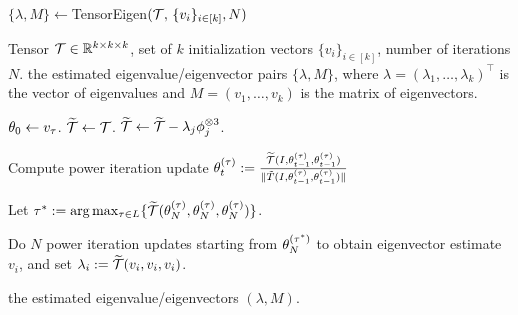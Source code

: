 \begin{algorithm}
\caption{$\{\lambda, M\}\leftarrow $TensorEigen$({\mathcal{T}},\, \{v_i\}_{i\in [k]}, N)$}\label{alg:robustpower}
\begin{algorithmic}
\renewcommand{\algorithmicrequire}{\textbf{Input: }}
\renewcommand{\algorithmicensure}{\textbf{Output: }}
\REQUIRE Tensor ${\mathcal{T}}\in \mathbb{R}^{k \times k \times k}$, set of $k$ initialization vectors $\{v_i\}_{i\in [k]}$, number of
iterations  $N$.
\ENSURE the estimated eigenvalue/eigenvector pairs $\{\lambda, M\}$, where $\lambda=(\lambda_1,\ldots,\lambda_k)^\top$ is the vector of eigenvalues and $M=(v_1,\ldots,v_k)$ is the matrix of eigenvectors.

\STATE $\theta_{0}\leftarrow v_\tau$.
\STATE $\widetilde{{\mathcal{T}}}\leftarrow {\mathcal{T}}$.
\STATE $\widetilde{{\mathcal{T}}}\leftarrow \widetilde{{\mathcal{T}}}- \lambda_j \phi_j^{\otimes 3}$.
\ENDIF
\ENDFOR

\STATE Compute power iteration update
$
\theta_{t}^{(\tau)}  :=
\frac{\widetilde{{\mathcal{T}}}(I, \theta_{t-1}^{(\tau)}, \theta_{t-1}^{(\tau)})}
{\|\tilde{T}(I, \theta_{t-1}^{(\tau)}, \theta_{t-1}^{(\tau)})\|}
$\ENDFOR
\ENDFOR

\STATE Let $\tau^* := \arg\max_{\tau \in L} \{ \widetilde{{\mathcal{T}}}(\theta_{N}^{(\tau)},
\theta_{N}^{(\tau)}, \theta_{N}^{(\tau)}) \}$.

\STATE Do $N$ power iteration updates starting from
$\theta_{N}^{(\tau^*)}$ to obtain eigenvector estimate $v_i$, and set $\lambda_i :=
\widetilde{{\mathcal{T}}}(v_i, v_i, v_i)$.

\ENDFOR
\RETURN the estimated eigenvalue/eigenvectors
$(\lambda, M)$.

\end{algorithmic}
\end{algorithm}
%
%
%
